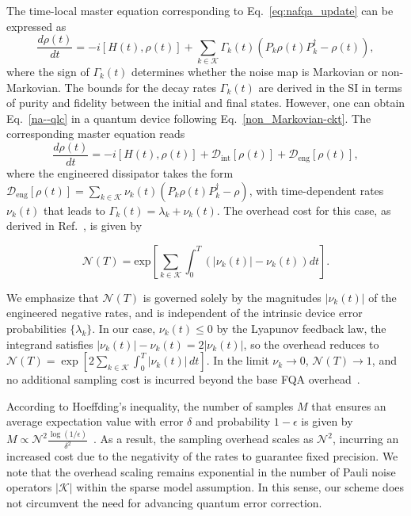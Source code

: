 \documentclass[10pt, superscriptaddress,aps,pra,twocolumn,showpacs,nofootinbib, longbibliography, notitlepage,floatfix]{revtex4-2}
\begin{document}
The time-local master equation corresponding to Eq.~\eqref{eq:nafqa_update} can be expressed as 
\begin{equation}
    \frac{d \rho(t)}{dt} = -i [H(t), \rho(t)] + \sum_{k\in \mathcal{K}} \Gamma_k(t) (P_k \rho(t) P_k^{\dagger} - \rho(t)),\label{na--qlc}
\end{equation}
where the sign of $\Gamma_k(t)$ determines whether the noise map is Markovian or non-Markovian. The bounds for the decay rates $\Gamma_k(t)$ are derived in the SI in terms of purity and fidelity between the initial and final states. However, one can obtain Eq.~\eqref{na--qlc} in a quantum device following Eq.~\eqref{non_Markovian-ckt}. The corresponding master equation reads
\begin{equation}
    \frac{d \rho(t)}{dt} = -i [H(t), \rho(t)] + \mathcal{D}_{\text{int}} [\rho(t)] + \mathcal{D}_{\text{eng}} [\rho(t)],\label{NAFQA-qlc}
\end{equation}
where the engineered dissipator takes the form $\mathcal{D}_{\text{eng}} [\rho(t)] = \sum_{k\in \mathcal{K}} \nu_k(t) (P_k \rho(t) P_k^{\dagger} - \rho)$, with time-dependent rates $\nu_k(t)$ that leads to $\Gamma_k(t) = \lambda_k + \nu_k(t)$. The overhead cost for this case, as derived in Ref.~\cite{Enod_PhysRevA_2021}, is given by
{\begin{equation}
    \mathcal{N} (T) = \text{exp}\left[\sum_{k\in \mathcal{K}} \int_0^T\left( |\nu_k(t)| - \nu_k(t) \right) dt\right].\label{error_mitigation_cost}
\end{equation}

We emphasize that $\mathcal{N}(T)$ is governed solely by the magnitudes $|\nu_k(t)|$ of the engineered negative rates, and is independent of the intrinsic device error probabilities $\{\lambda_k\}$. In our case, $\nu_k(t) \leq 0$ by the Lyapunov feedback law, the integrand satisfies $|\nu_k(t)| - \nu_k(t) = 2|\nu_k(t)|$, so the overhead reduces to $\mathcal{N}(T) = \exp\!\left[2\sum_{k\in\mathcal{K}}\int_0^T|\nu_k(t)|\,dt\right]$. In the limit $\nu_k \to 0$, $\mathcal{N}(T) \to 1$, and no additional sampling cost is incurred beyond the base FQA overhead~\cite{SarovarPRL2022}.} According to Hoeffding's inequality, the number of samples $M$ that ensures an average expectation value with error $\delta$ and probability $1-\epsilon$ is given by $M \propto \mathcal{N}^2\frac{\log(1/\epsilon)}{\delta^2}$~\cite{Jinzhao_Sun_PhysRevApplied_2021}. As a result, the sampling overhead scales as $\mathcal{N}^2$, incurring an increased cost due to the negativity of the rates to guarantee fixed precision. We note that the overhead scaling remains exponential in the number of Pauli noise operators $|\mathcal{K}|$ within the sparse model assumption. In this sense, our scheme does not circumvent the need for advancing quantum error correction. 
\end{document}
